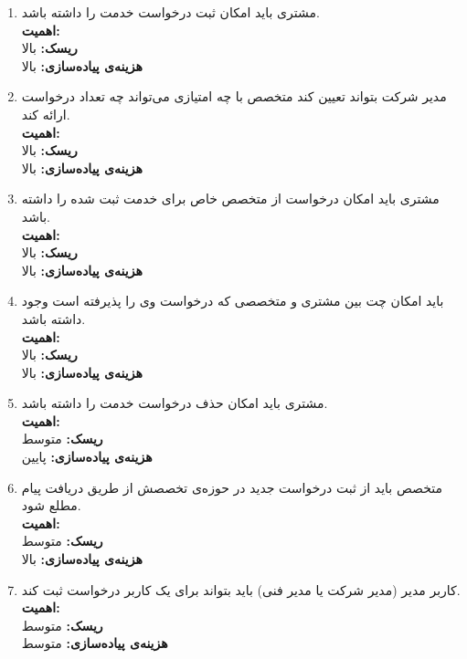 \begin{enumerate}
	
	\item
مشتری باید امکان ثبت درخواست خدمت را داشته باشد.
	\\
	\textbf{اهمیت:} 
	\\
	\textbf{ریسک:} بالا
	\\
	\textbf{هزینه‌ی پیاده‌سازی:} بالا
	
			\item
	مدیر شرکت بتواند تعیین کند متخصص با چه امتیازی می‌تواند چه تعداد درخواست ارائه کند.
	\\
	\textbf{اهمیت:} 
	\\
	\textbf{ریسک:} بالا
	\\
	\textbf{هزینه‌ی پیاده‌سازی:} بالا
	
	
	
	\item
	مشتری باید امکان درخواست از متخصص خاص برای خدمت ثبت شده را داشته باشد.
	\\
	\textbf{اهمیت:} 
	\\
	\textbf{ریسک:} بالا
	\\
	\textbf{هزینه‌ی پیاده‌سازی:} بالا
	
	
	\item
باید امکان چت بین مشتری و متخصصی که درخواست وی را پذیرفته است وجود داشته باشد.
	\\
	\textbf{اهمیت:} 
	\\
	\textbf{ریسک:} بالا
	\\
	\textbf{هزینه‌ی پیاده‌سازی:} بالا
	
	\item
	مشتری باید امکان حذف درخواست خدمت را داشته باشد.
	\\
	\textbf{اهمیت:} 
	\\
	\textbf{ریسک:} متوسط
	\\
	\textbf{هزینه‌ی پیاده‌سازی:} پایین
	
	\item
	متخصص باید از ثبت درخواست جدید در حوزه‌ی تخصصش از طریق دریافت پیام مطلع شود.
	\\
	\textbf{اهمیت:} 
	\\
	\textbf{ریسک:} متوسط
	\\
	\textbf{هزینه‌ی پیاده‌سازی:} بالا
	
		\item
کاربر مدیر (مدیر شرکت یا مدیر فنی) باید بتواند برای یک کاربر درخواست ثبت کند.
	\\
	\textbf{اهمیت:} 
	\\
	\textbf{ریسک:} متوسط
	\\
	\textbf{هزینه‌ی پیاده‌سازی:} متوسط
	

\end{enumerate}
